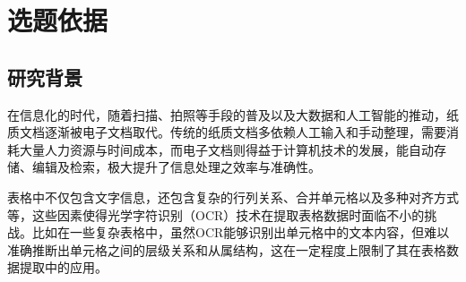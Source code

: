 \documentclass[UTF8,12pt, AutoFakeBold,fontset = founder]{ctexart}
\begin{document}


\setcounter{page}{1} %
\section{选题依据}

\subsection{研究背景}

在信息化的时代，随着扫描、拍照等手段的普及以及大数据和人工智能的推动，纸质文档逐渐被电子文档取代。传统的纸质文档多依赖人工输入和手动整理，需要消耗大量人力资源与时间成本，而电子文档则得益于计算机技术的发展，能自动存储、编辑及检索，极大提升了信息处理之效率与准确性。

表格中不仅包含文字信息，还包含复杂的行列关系、合并单元格以及多种对齐方式等，这些因素使得光学字符识别（OCR）\cite{b1, b2}技术在提取表格数据时面临不小的挑战。比如在一些复杂表格中，虽然OCR能够识别出单元格中的文本内容，但难以准确推断出单元格之间的层级关系和从属结构，这在一定程度上限制了其在表格数据提取中的应用。
\end{document}
